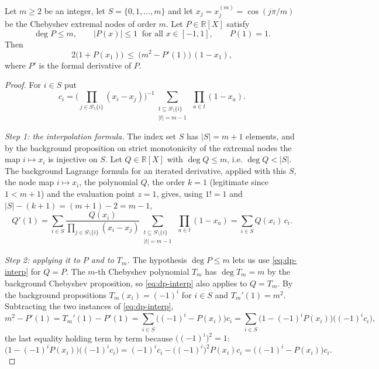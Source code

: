 \begin{lemma}
Let $m\ge2$ be an integer, let $S=\{0,1,\dots,m\}$ and let
$x_j=x^{(m)}_j=\cos(j\pi/m)$ be the Chebyshev extremal nodes of order $m$. Let
$P\in\mathbb{R}[X]$ satisfy
\[
  \deg P\le m,\qquad \lvert P(x)\rvert\le1\ \text{ for all }x\in[-1,1],\qquad
  P(1)=1 .
\]
Then
\[
  2\bigl(1+P(x_1)\bigr)\ \le\ \bigl(m^2-P'(1)\bigr)\,(1-x_1),
\]
where $P'$ is the formal derivative of $P$.
\end{lemma}
\begin{proof}
For $i\in S$ put
\[
  c_i=\Biggl(\prod_{j\in S\setminus\{i\}}(x_i-x_j)\Biggr)^{-1}
    \sum_{\substack{t\subseteq S\setminus\{i\}\\ \lvert t\rvert=m-1}}
      \ \prod_{a\in t}(1-x_a).
\]

\emph{Step 1: the interpolation formula.} The index set $S$ has
$\lvert S\rvert=m+1$ elements, and by the background proposition on strict
monotonicity of the extremal nodes the map $i\mapsto x_i$ is injective on $S$.
Let $Q\in\mathbb{R}[X]$ with $\deg Q\le m$, i.e. $\deg Q<\lvert S\rvert$. The
background Lagrange formula for an iterated derivative, applied with this $S$,
the node map $i\mapsto x_i$, the polynomial $Q$, the order $k=1$ (legitimate
since $1<m+1$) and the evaluation point $z=1$, gives, using $1!=1$ and
$\lvert S\rvert-(k+1)=(m+1)-2=m-1$,
\begin{equation}\label{eq:dp-interp}
  Q'(1)=\sum_{i\in S}
    \frac{Q(x_i)}{\prod_{j\in S\setminus\{i\}}(x_i-x_j)}
    \sum_{\substack{t\subseteq S\setminus\{i\}\\ \lvert t\rvert=m-1}}
      \ \prod_{a\in t}(1-x_a)
  =\sum_{i\in S}Q(x_i)\,c_i .
\end{equation}

\emph{Step 2: applying it to $P$ and to $T_m$.} The hypothesis $\deg P\le m$
lets us use \eqref{eq:dp-interp} for $Q=P$. The $m$-th Chebyshev polynomial
$T_m$ has $\deg T_m=m$ by the background Chebyshev proposition, so
\eqref{eq:dp-interp} also applies to $Q=T_m$. By the background propositions
$T_m(x_i)=(-1)^i$ for $i\in S$ and $T_m'(1)=m^2$. Subtracting the two instances
of \eqref{eq:dp-interp},
\begin{equation}\label{eq:dp-diff}
  m^2-P'(1)=T_m'(1)-P'(1)
   =\sum_{i\in S}\bigl((-1)^i-P(x_i)\bigr)c_i
   =\sum_{i\in S}\bigl(1-(-1)^iP(x_i)\bigr)\bigl((-1)^ic_i\bigr),
\end{equation}
the last equality holding term by term because $\bigl((-1)^i\bigr)^2=1$:
\[
  \bigl(1-(-1)^iP(x_i)\bigr)\bigl((-1)^ic_i\bigr)
  =(-1)^ic_i-\bigl((-1)^i\bigr)^2P(x_i)c_i
  =\bigl((-1)^i-P(x_i)\bigr)c_i .
\]


\end{proof}
